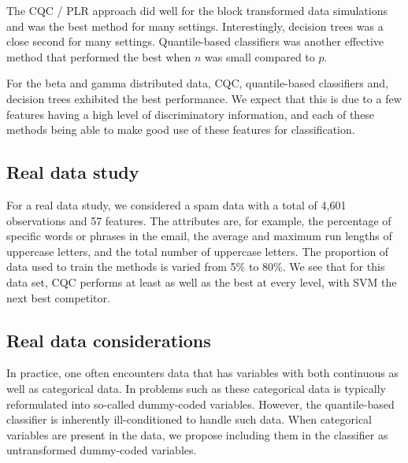 The CQC / PLR approach did well for the block transformed data simulations and
was the best method for many settings.  Interestingly, decision trees was a
close second for many settings.  Quantile-based classifiers was another
effective method that performed the best when $n$ was small compared to $p$.

For the beta and gamma distributed data, CQC, quantile-based classifiers and,
decision trees exhibited the best performance.  We expect that this is due to a
few features having a high level of discriminatory information, and each of
these methods being able to make good use of these features for classification.




\subsection{Real data study}
\label{sec:real-data-study}

For a real data study, we considered a spam data with a total of 4,601
observations and 57 features.  The attributes are, for example, the percentage
of specific words or phrases in the email, the average and maximum run lengths
of uppercase letters, and the total number of uppercase letters.  The proportion
of data used to train the methods is varied from 5\% to 80\%.  We see that for
this data set, CQC performs at least as well as the best at every level, with
SVM the next best competitor.



\subsection{Real data considerations}

In practice, one often encounters data that has variables with both continuous
as well as categorical data.  In problems such as these categorical data is
typically reformulated into so-called dummy-coded variables.  However, the
quantile-based classifier is inherently ill-conditioned to handle such data.
When categorical variables are present in the data, we propose including them in
the classifier as untransformed dummy-coded variables.

